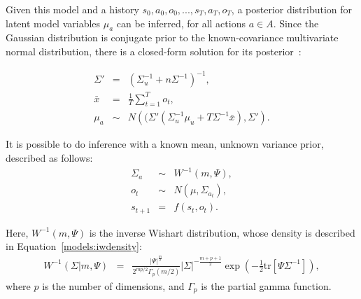 Given this model and a history $s_0, a_0, o_0, ..., s_T, a_T, o_T$, a posterior distribution for latent model variables $\mu_a$ can be inferred, for all actions $a \in A$. Since the Gaussian distribution is conjugate prior to the known-covariance multivariate normal distribution, there is a closed-form solution for its posterior\reply~\cite{fink1997compendium}:

\begin{eqnarray}
\Sigma' &=& \left(\Sigma_u^{-1}+n\Sigma^{-1}\right)^{-1},\\
\bar x &=& \frac 1 T \sum_{t=1}^T o_t,\\
\mu_a &\sim& N\left((\Sigma'\left(\Sigma_u^{-1}\mu_u+T\Sigma^{-1}\bar x\right), \Sigma'\right).
\end{eqnarray}

It is possible to do inference with a known mean, unknown variance prior, described as follows:
\begin{eqnarray}
\Sigma_a &\sim& W^{-1}(m, \Psi),\\
o_t &\sim& N(\mu, \Sigma_{a_t}),\\
s_{t+1} &=& f(s_t, o_t).
\end{eqnarray}

Here, $W^{-1}(m, \Psi)$ is the inverse Wishart distribution, whose density is described in Equation~\ref{models:iwdensity}:
\begin{eqnarray}
\label{models:iwdensity}W^{-1}(\Sigma|m,\Psi)&=&\frac{|\Psi|^{\frac{m}{2}}}{2^{mp/2}\Gamma_p(m/2)}|\Sigma|^{-\frac{m+p+1}{2}}\exp\left(- \frac 1 2 \mbox{tr}\left[\Psi\Sigma^{-1}\right]\right),
\end{eqnarray}
where $p$ is the number of dimensions, and $\Gamma_p$ is the partial gamma function.

